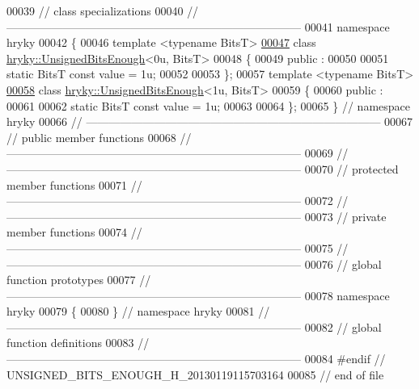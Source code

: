 \begin{DoxyCode}
00039 \textcolor{comment}{// class specializations}
00040 \textcolor{comment}{//
      ------------------------------------------------------------------------------}
00041 \textcolor{keyword}{namespace }hryky
00042 \{
00046 \textcolor{keyword}{template} <\textcolor{keyword}{typename} BitsT>
\hypertarget{unsigned__bits__enough_8h_source_l00047}{}\hyperlink{classhryky_1_1hryky_1_1_unsigned_bits_enough_3_010u_00_01_bits_t_01_4}{00047} \textcolor{keyword}{class }\hyperlink{classhryky_1_1_unsigned_bits_enough}{hryky::UnsignedBitsEnough}<0u, BitsT>
00048 \{
00049 \textcolor{keyword}{public} :
00050 
00051     \textcolor{keyword}{static} BitsT \textcolor{keyword}{const} value = 1u;
00052 
00053 \};
00057 \textcolor{keyword}{template} <\textcolor{keyword}{typename} BitsT>
\hypertarget{unsigned__bits__enough_8h_source_l00058}{}\hyperlink{classhryky_1_1hryky_1_1_unsigned_bits_enough_3_011u_00_01_bits_t_01_4}{00058} \textcolor{keyword}{class }\hyperlink{classhryky_1_1_unsigned_bits_enough}{hryky::UnsignedBitsEnough}<1u, BitsT>
00059 \{
00060 \textcolor{keyword}{public} :
00061 
00062     \textcolor{keyword}{static} BitsT \textcolor{keyword}{const} value = 1u;
00063 
00064 \};
00065 \} \textcolor{comment}{// namespace hryky}
00066 \textcolor{comment}{//
      ------------------------------------------------------------------------------}
00067 \textcolor{comment}{// public member functions}
00068 \textcolor{comment}{//
      ------------------------------------------------------------------------------}
00069 \textcolor{comment}{//
      ------------------------------------------------------------------------------}
00070 \textcolor{comment}{// protected member functions}
00071 \textcolor{comment}{//
      ------------------------------------------------------------------------------}
00072 \textcolor{comment}{//
      ------------------------------------------------------------------------------}
00073 \textcolor{comment}{// private member functions}
00074 \textcolor{comment}{//
      ------------------------------------------------------------------------------}
00075 \textcolor{comment}{//
      ------------------------------------------------------------------------------}
00076 \textcolor{comment}{// global function prototypes}
00077 \textcolor{comment}{//
      ------------------------------------------------------------------------------}
00078 \textcolor{keyword}{namespace }hryky
00079 \{
00080 \} \textcolor{comment}{// namespace hryky}
00081 \textcolor{comment}{//
      ------------------------------------------------------------------------------}
00082 \textcolor{comment}{// global function definitions}
00083 \textcolor{comment}{//
      ------------------------------------------------------------------------------}
00084 \textcolor{preprocessor}{#endif // UNSIGNED\_BITS\_ENOUGH\_H\_20130119115703164}
00085 \textcolor{preprocessor}{}\textcolor{comment}{// end of file}
\end{DoxyCode}
